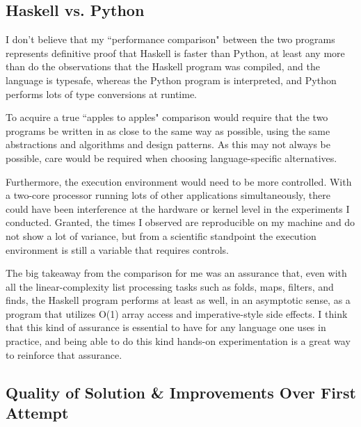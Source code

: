 \documentclass[12pt,a4paper]{article}
\begin{document}
		\subsection{Haskell vs. Python}
		
		\par I don't believe that my ``performance comparison" between the two programs represents definitive proof that Haskell is faster than Python, at least any more than do the observations that the Haskell program was compiled, and the language is typesafe, whereas the Python program is interpreted, and Python performs lots of type conversions at runtime. 
		\par To acquire a true ``apples to apples" comparison would require that the two programs be written in as close to the same way as possible, using the same abstractions and algorithms and design patterns. As this may not always be possible, care would be required when choosing language-specific alternatives. 
		\par Furthermore, the execution environment would need to be more controlled. With a two-core processor running lots of other applications simultaneously, there could have been interference at the hardware or kernel level in the experiments I conducted. Granted, the times I observed are reproducible on my machine and do not show a lot of variance, but from a scientific standpoint the execution environment is still a variable that requires controls. 
		\par The big takeaway from the comparison for me was an assurance that, even with all the linear-complexity list processing tasks such as folds, maps, filters, and finds, the Haskell program performs at least as well, in an asymptotic sense, as a program that utilizes O(1) array access and imperative-style side effects. I think that this kind of assurance is essential to have for any language one uses in practice, and being able to do this kind hands-on experimentation is a great way to reinforce that assurance.
		
		\subsection{Quality of Solution \& Improvements Over First Attempt}
		
\end{document}
